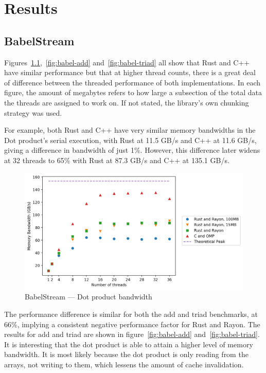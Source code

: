\chapter{Results}
\section{BabelStream}\label{sec:res-babel}
Figures~\ref{fig:babel-dot},~\ref{fig:babel-add} and~\ref{fig:babel-triad} all show that Rust and C++ have similar performance but that at higher thread counts, there is a great deal of difference between the threaded performance of both implementations. In each figure, the amount of megabytes refers to how large a subsection of the total data the threads are assigned to work on. If not stated, the library's own chunking strategy was used.

For example, both Rust and C++ have very similar memory bandwidths in the Dot product's serial execution, with Rust at 11.5 GB/s and C++ at 11.6 GB/s, giving a difference in bandwidth of just 1\%.
However, this difference later widens at 32 threads to 65\% with Rust at 87.3 GB/s and C++ at 135.1 GB/s.

\begin{figure}[h]
\centering
\includegraphics[width=.9\linewidth]{figs/babel/Dot.png}
\caption{BabelStream --- Dot product bandwidth}\label{fig:babel-dot}
\end{figure}

The performance difference is similar for both the add and triad benchmarks, at 66\%, implying a consistent negative performance factor for Rust and Rayon. The results for add and triad are shown in figure~\ref{fig:babel-add} and~\ref{fig:babel-triad}.
It is interesting that the dot product is able to attain a higher level of memory bandwidth. It is most likely because the dot product is only reading from the arrays, not writing to them, which lessens the amount of cache invalidation.

